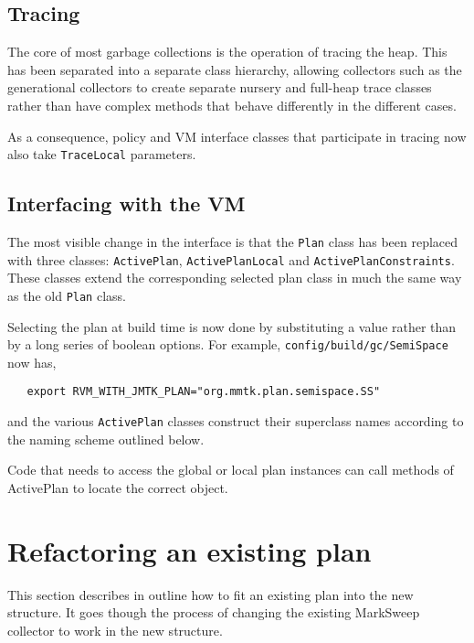 \documentclass[10pt]{article}
\newcommand{\code}[1]{\lstinline!#1!}
\begin{document}
\subsection{Tracing}

The core of most garbage collections is the operation of tracing the
heap.  This has been separated into a separate class hierarchy,
allowing collectors such as the generational collectors to create
separate nursery and full-heap trace classes rather than have complex
methods that behave differently in the different cases.

As a consequence, policy and VM interface classes that participate in
tracing now also take \code{TraceLocal} parameters.

\subsection{Interfacing with the VM}

The most visible change in the interface is that the \code{Plan} class
has been replaced with three classes: \code{ActivePlan},
\code{ActivePlanLocal} and \code{ActivePlanConstraints}.  These classes
extend the corresponding selected plan class in much the same
way as the old \code{Plan} class.

Selecting the plan at build time is now done by substituting a value
rather than by a long series of boolean options.  For example,
\code{config/build/gc/SemiSpace} now has,
\begin{lstlisting}
   export RVM_WITH_JMTK_PLAN="org.mmtk.plan.semispace.SS"
\end{lstlisting} 
and the various \code{ActivePlan} classes construct their superclass
names according to the naming scheme outlined below.

Code that needs to access the global or local plan instances can call
methods of ActivePlan to locate the correct object.

\section{Refactoring an existing plan}

This section describes in outline how to fit an existing plan into the
new structure.  It goes though the process of changing the existing
MarkSweep collector to work in the new structure.
\end{document}

